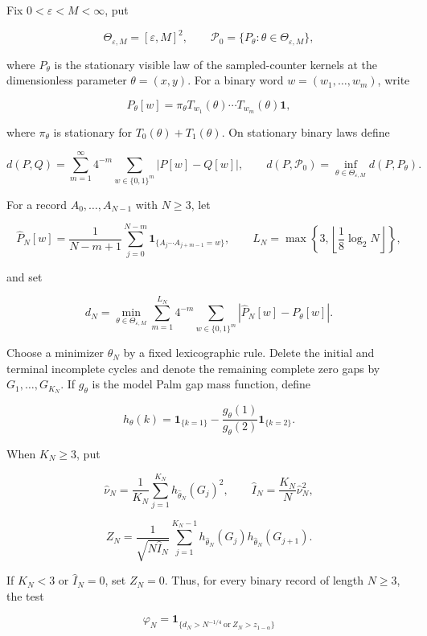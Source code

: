 \begin{paperthm}
\label{thm:complete-visible-law-specification-main}
Fix $0<\varepsilon<M<\infty$, put

\[
\Theta_{\varepsilon,M}=[\varepsilon,M]^2,
\qquad \mathcal P_0=\{P_\theta:\theta\in\Theta_{\varepsilon,M}\},
\]

where $P_\theta$ is the stationary visible law of the sampled-counter kernels
at the dimensionless parameter $\theta=(x,y)$.  For a binary word
$w=(w_1,\ldots,w_m)$, write

\[
P_\theta[w]=\pi_\theta T_{w_1}(\theta)\cdots
T_{w_m}(\theta)\mathbf1,
\]

where $\pi_\theta$ is stationary for $T_0(\theta)+T_1(\theta)$.  On
stationary binary laws define

\[
d(P,Q)=\sum_{m=1}^{\infty}4^{-m}
\sum_{w\in\{0,1\}^m}|P[w]-Q[w]|,
\qquad
d(P,\mathcal P_0)=\inf_{\theta\in\Theta_{\varepsilon,M}}d(P,P_\theta).
\]

For a record $A_0,\ldots,A_{N-1}$ with $N\ge3$, let

\[
\widehat P_N[w]=\frac1{N-m+1}\sum_{j=0}^{N-m}
\mathbf1_{\{A_j\cdots A_{j+m-1}=w\}},
\qquad
L_N=\max\left\{3,\left\lfloor\frac18\log_2N\right\rfloor\right\},
\]

and set

\[
d_N=\min_{\theta\in\Theta_{\varepsilon,M}}
\sum_{m=1}^{L_N}4^{-m}\sum_{w\in\{0,1\}^m}
|\widehat P_N[w]-P_\theta[w]|.
\]

Choose a minimizer $\widehat\theta_N$ by a fixed lexicographic rule.  Delete
the initial and terminal incomplete cycles and denote the remaining complete
zero gaps by $G_1,\ldots,G_{K_N}$.  If $g_\theta$ is the model Palm gap
mass function, define

\[
h_\theta(k)=\mathbf1_{\{k=1\}}
-\frac{g_\theta(1)}{g_\theta(2)}\mathbf1_{\{k=2\}}.
\]

When $K_N\ge3$, put

\[
\widehat\nu_N=\frac1{K_N}\sum_{j=1}^{K_N}
h_{\widehat\theta_N}(G_j)^2,
\qquad
\widehat I_N=\frac{K_N}{N}\widehat\nu_N^2,
\]

\[
Z_N=\frac{1}{\sqrt{N\widehat I_N}}
\sum_{j=1}^{K_N-1}
h_{\widehat\theta_N}(G_j)h_{\widehat\theta_N}(G_{j+1}).
\]

If $K_N<3$ or $\widehat I_N=0$, set $Z_N=0$.  Thus, for every binary
record of length $N\ge3$, the test

\[
\varphi_N=\mathbf1_{\{d_N>N^{-1/4}\ \text{or}\ Z_N>z_{1-\alpha}\}}
\tag{F}
\]


\end{paperthm}
